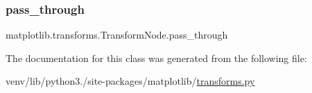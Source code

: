 \subsubsection{\texorpdfstring{pass\+\_\+through}{pass\_through}}
{\footnotesize\ttfamily matplotlib.\+transforms.\+Transform\+Node.\+pass\+\_\+through\hspace{0.3cm}{\ttfamily [static]}}



The documentation for this class was generated from the following file\+:\begin{DoxyCompactItemize}
\item 
venv/lib/python3./site-\/packages/matplotlib/\hyperlink{transforms_8py}{transforms.\+py}\end{DoxyCompactItemize}
